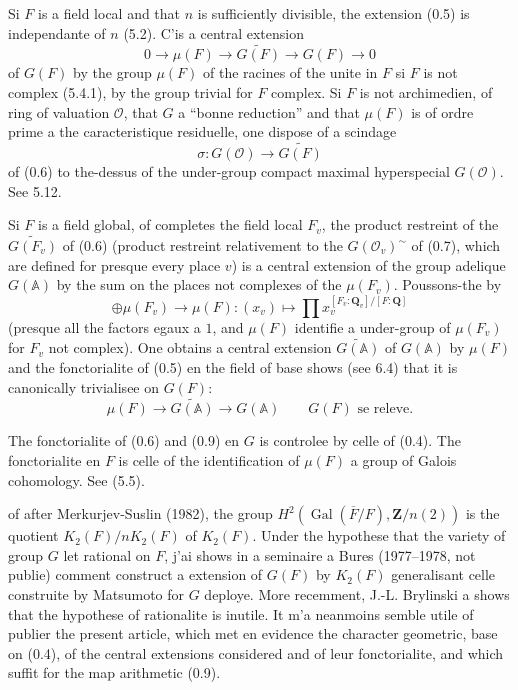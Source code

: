 \documentclass[11pt,a4paper]{article}
\theoremstyle{plain}
\theoremstyle{definition}
\DeclareMathOperator{\Gal}{Gal}
\begin{document}
Si $F$ is a field local and that $n$ is sufficiently divisible, the extension (0.5) is independante of $n$ (5.2). C'is a central extension
\begin{equation}\label{0.6}
0 \to \mu(F) \to \widetilde{G(F)} \to G(F) \to 0
\end{equation}
of $G(F)$ by the group $\mu(F)$ of the racines of the unite in $F$ si $F$ is not complex (5.4.1), by the group trivial for $F$ complex. Si $F$ is not archimedien, of ring of valuation $\mathcal{O}$, that $G$ a ``bonne reduction'' and that $\mu(F)$ is of ordre prime a the caracteristique residuelle, one dispose of a scindage
\begin{equation}\label{0.7}
\sigma : G(\mathcal{O}) \to \widetilde{G(F)}
\end{equation}
of (0.6) to the-dessus of the under-group compact maximal hyperspecial $G(\mathcal{O})$. See 5.12.

Si $F$ is a field global, of completes the field local $F_v$, the product restreint of the $\widetilde{G(F_v)}$ of (0.6) (product restreint relativement to the $G(\mathcal{O}_v)^{\sim}$ of (0.7), which are defined for presque every place $v$) is a central extension of the group adelique $G(\mathbb{A})$ by the sum on the places not complexes of the $\mu(F_v)$. Poussons-the by
\begin{equation}\label{0.8}
\oplus \mu(F_v) \to \mu(F) : (x_v) \mapsto \prod x_v^{[F_v:\mathbf{Q}_v]/[F:\mathbf{Q}]}
\end{equation}
(presque all the factors egaux a $1$, and $\mu(F)$ identifie a under-group of $\mu(F_v)$ for $F_v$ not complex). One obtains a central extension $\widetilde{G(\mathbb{A})}$ of $G(\mathbb{A})$ by $\mu(F)$ and the fonctorialite of (0.5) en the field of base shows (see 6.4) that it is canonically trivialisee on $G(F)$:
\begin{equation}\label{0.9}
\mu(F) \to \widetilde{G(\mathbb{A})} \to G(\mathbb{A}) \qquad G(F) \text{ se releve.}
\end{equation}

The fonctorialite of (0.6) and (0.9) en $G$ is controlee by celle of (0.4). The fonctorialite en $F$ is celle of the identification of $\mu(F)$ a group of Galois cohomology. See (5.5).

of after Merkurjev-Suslin (1982), the group $H^2(\Gal(\overline{F}/F), \mathbf{Z}/n(2))$ is the quotient $K_2(F)/nK_2(F)$ of $K_2(F)$. Under the hypothese that the variety of group $G$ let rational on $F$, j'ai shows in a seminaire a Bures (1977--1978, not publie) comment construct a extension of $G(F)$ by $K_2(F)$ generalisant celle construite by Matsumoto for $G$ deploye. More recemment, J.-L. Brylinski a shows that the hypothese of rationalite is inutile. It m'a neanmoins semble utile of publier the present article, which met en evidence the character geometric, base on (0.4), of the central extensions considered and of leur fonctorialite, and which suffit for the map arithmetic (0.9).
\end{document}

